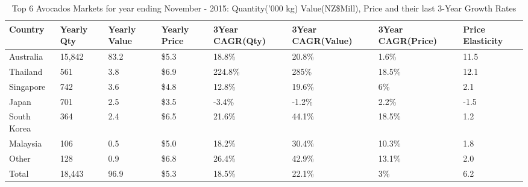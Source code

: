 \begin{table}[ht]
\centering
{\scriptsize
\begin{tabular}[t]{p{1.8cm}>{\hfill}p{1.4cm}>{\hfill}p{1.4cm}>{\hfill}p{1.6cm}>{\hfill}p{1.9cm}>{\hfill}p{2cm}>{\hfill}p{1.9cm}>{\hfill}p{1.5cm}}
 \textbf{Country} & \textbf{Yearly Qty} & \textbf{Yearly Value} & \textbf{Yearly Price} & \textbf{3Year CAGR(Qty)} & \textbf{3Year CAGR(Value)} & \textbf{3Year CAGR(Price)} & \textbf{Price Elasticity} \\
\hline
Australia & 15,842 & 83.2 & \$5.3 & 18.8\% & 20.8\% & 1.6\% & 11.5 \\  
Thailand & 561 & 3.8 & \$6.9 & 224.8\% & 285\% & 18.5\% & 12.1 \\  
Singapore & 742 & 3.6 & \$4.8 & 12.8\% & 19.6\% & 6\% & 2.1 \\  
Japan & 701 & 2.5 & \$3.5 & -3.4\% & -1.2\% & 2.2\% & -1.5 \\  
South Korea & 364 & 2.4 & \$6.5 & 21.6\% & 44.1\% & 18.5\% & 1.2 \\  
Malaysia & 106 & 0.5 & \$5.0 & 18.2\% & 30.4\% & 10.3\% & 1.8 \\  
Other & 128 & 0.9 & \$6.8 & 26.4\% & 42.9\% & 13.1\% & 2.0 \\  
Total & 18,443 & 96.9 & \$5.3 & 18.5\% & 22.1\% & 3\% & 6.2 \\  
\hline
\end{tabular}
}
\caption{\scriptsize Top 6 Avocados Markets for year ending November - 2015: Quantity('000 kg) Value(NZ\$Mill), Price and their last 3-Year Growth Rates}
\end{table}

